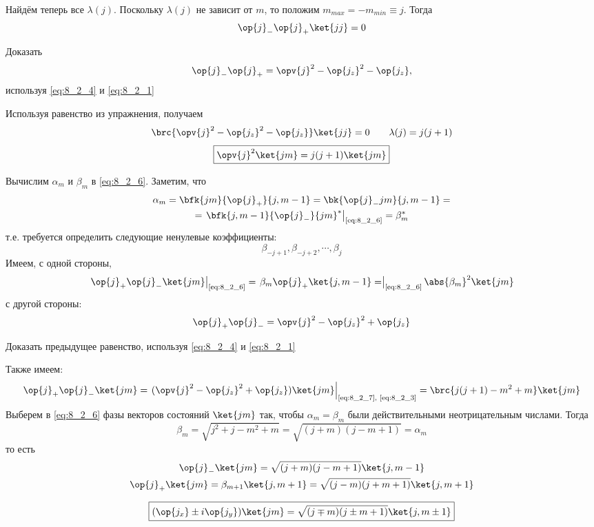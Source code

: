 Найдём теперь все $\lambda(j)$. Поскольку $\lambda(j)$ не зависит от $m$, то положим $m_{max} = -m_{min} \equiv j$. Тогда
$$
\op{j}_{-} \op{j}_{+} \ket{jj} = 0
$$%
%
\begin{excr}
Доказать
$$
\op{j}_{-} \op{j}_{+} = \opv{j}^2 - \op{j_z}^2 - \op{j_z},
$$
используя \eqref{eq:8_2_4} и \eqref{eq:8_2_1}
\end{excr}%
%
Используя равенство из упражнения, получаем
$$
\brc{\opv{j}^2 - \op{j_z}^2 - \op{j_z}} \ket{jj} = 0 ~~~~~~ \lambda(j) = j(j+1)
$$
\begin{equation}
\label{eq:8_2_7}
\boxed {
	\opv{j}^2 \ket{jm} = j(j+1) \ket{jm}
}
\end{equation}

Вычислим $\alpha_m$ и $\beta_m$ в \eqref{eq:8_2_6}. Заметим, что
$$
\begin{gathered}
\alpha_m = \bfk{jm}{\op{j}_{+}}{j, m-1} = \bk{\op{j}_{-}jm}{j, m-1} =\\= \left. \bfk{j,m-1}{\op{j}_{-}}{jm}^* \right|_{\text{\eqref{eq:8_2_6}}} = \beta_m^*
\end{gathered}
$$%
%
т.е. требуется определить следующие ненулевые коэффициенты:
$$
\beta_{-j+1}, \beta_{-j+2}, \cdots, \beta_{j}
$$%
%
Имеем, с одной стороны,
$$
\left. \op{j}_{+} \op{j}_{-} \ket{jm} \right|_{\text{\eqref{eq:8_2_6}}}
= \left. \beta_m \op{j}_{+} \ket{j, m-1} 
= \right|_{\text{\eqref{eq:8_2_6}}} \abs{\beta_m}^2 \ket{jm}
$$%
%
с другой стороны:
$$
\op{j}_{+} \op{j}_{-} = \opv{j}^2 - \op{j_z}^2 + \op{j_z}
$$

\begin{excr}
Доказать предыдущее равенство, используя \eqref{eq:8_2_4} и \eqref{eq:8_2_1}
\end{excr}%
%
\noindent
Также имеем:
$$
\op{j}_{+} \op{j}_{-} \ket{jm} = \left. (\opv{j}^2 - \op{j_z}^2 + \op{j_z}) \ket{jm} \right|_{\text{\eqref{eq:8_2_7}, \eqref{eq:8_2_3}}} = \brc{j(j+1) - m^2 + m} \ket{jm}
$$%
%
Выберем в \eqref{eq:8_2_6} фазы векторов состояний $\ket{jm}$ так, чтобы $\alpha_m = \beta_m$ были действительными неотрицательным числами. Тогда
$$
\beta_m = \sqrt{j^2 + j - m^2 + m} = \sqrt{(j+m)(j-m+1)} = \alpha_m
$$%
%
то есть
$$
\begin{gathered}
\op{j}_{-} \ket{jm} = \sqrt{(j+m)(j-m+1)} \ket{j, m-1} \\
\op{j}_{+} \ket{jm} = \beta_{m+1} \ket{j, m+1} = \sqrt{(j-m)(j+m+1)} \ket{j, m+1}
\end{gathered}
$$

\begin{equation}
\label{eq:8_2_8}
\boxed {
	(\op{j_x} \pm i \op{j_y}) \ket{jm} = \sqrt{(j \mp m)(j \pm m + 1)} \ket{j, m \pm 1}
}
\end{equation}


